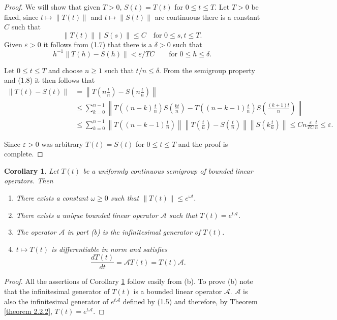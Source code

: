 \documentclass[12pt, oneside]{book}
\newtheorem{coro}{Corollary}[section]
\newcommand{\A}{\mathscr{A}}
\begin{document}
\begin{proof}
We will show that given $T>0$, $S(t)=T(t)$ for $0\leq t\leq T$.
Let $T>0$ be fixed, since $t\mapsto \|T(t)\|$ and $t\mapsto \|S(t)\|$
are continuous there is a constant $C$ such that
\[
\|T(t)\|\|S(s)\|\leq C \quad \text{for } 0\leq s,t\leq T.
\]
Given $\varepsilon>0$ it follows from (1.7) that there is a
$\delta>0$ such that
\[
h^{-1}\|T(h)-S(h)\|<\varepsilon/TC
\qquad \text{for } 0\leq h\leq \delta.
\tag{1.8}
\]

Let $0\leq t\leq T$ and choose $n\geq 1$ such that $t/n\leq \delta$.
From the semigroup property and (1.8) it then follows that
\begin{align*}
\|T(t)-S(t)\|
&=\left\|T\left(n\frac{t}{n}\right)-S\left(n\frac{t}{n}\right)\right\|\\
&\leq\sum_{k=0}^{n-1}
\left\|T\left((n-k)\frac{t}{n}\right)S\left(\frac{kt}{n}\right)-T\left((n-k-1)\frac{t}{n}\right)S\left(\frac{(k+1)t}{n}\right)\right\|\\
&\leq \sum_{k=0}^{n-1}\left\|T\left((n-k-1)\frac{t}{n}\right)\right\|\left\|T\left(\frac{t}{n}\right)-S\left(\frac{t}{n}\right) \right\|\left\|S\left(k\frac{t}{n}\right)\right\|\leq Cn\frac{\varepsilon}{TC}\frac{t}{n}\leq \varepsilon.
\end{align*}

Since $\varepsilon>0$ was arbitrary $T(t)=S(t)$ for $0\leq t\leq T$
and the proof is complete. 
\end{proof}
\newpage
\begin{coro}\label{coro211}
Let $T(t)$ be a uniformly continuous semigroup of bounded linear
operators. Then

\begin{enumerate}
	\item[(a)]
	There exists a constant $\omega\geq 0$ such that $\|T(t)\|\leq e^{\omega t}$.
	\item[(b)]
	There exists a unique bounded linear operator $\A$ such that $T(t)=e^{t\mathscr{A}}$.
	\item[(c)]
	The operator $\mathscr{A}$ in part (b) is the infinitesimal generator of $T(t)$.
	\item[(d)]
	$t\mapsto T(t)$ is differentiable in norm and satisfies
	\[
	\frac{dT(t)}{dt}=\mathscr{A}T(t)=T(t)\mathscr{A}.
	\tag{1.9}
	\]
\end{enumerate}
\end{coro}

\begin{proof}
All the assertions of Corollary \ref{coro211} follow easily from (b).
To prove (b) note that the infinitesimal generator of $T(t)$ is a
bounded linear operator $\mathscr{A}$. $\mathscr{A}$ is also the infinitesimal generator
of $e^{t\mathscr{A}}$ defined by (1.5) and therefore, by Theorem \ref{theorem 2.2.2},
$T(t)=e^{t\mathscr{A}}$. 	
\end{proof}
\end{document}
